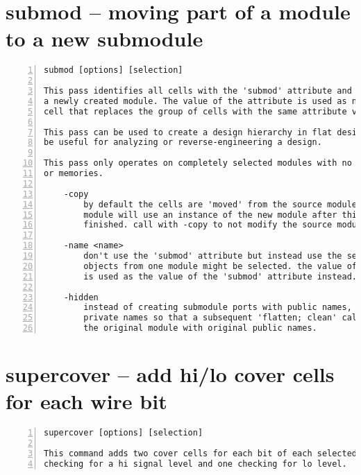 \section{submod -- moving part of a module to a new submodule}
\label{cmd:submod}
\begin{lstlisting}[numbers=left,frame=single]
    submod [options] [selection]

This pass identifies all cells with the 'submod' attribute and moves them to
a newly created module. The value of the attribute is used as name for the
cell that replaces the group of cells with the same attribute value.

This pass can be used to create a design hierarchy in flat design. This can
be useful for analyzing or reverse-engineering a design.

This pass only operates on completely selected modules with no processes
or memories.

    -copy
        by default the cells are 'moved' from the source module and the source
        module will use an instance of the new module after this command is
        finished. call with -copy to not modify the source module.

    -name <name>
        don't use the 'submod' attribute but instead use the selection. only
        objects from one module might be selected. the value of the -name option
        is used as the value of the 'submod' attribute instead.

    -hidden
        instead of creating submodule ports with public names, create ports with
        private names so that a subsequent 'flatten; clean' call will restore
        the original module with original public names.
\end{lstlisting}

\section{supercover -- add hi/lo cover cells for each wire bit}
\label{cmd:supercover}
\begin{lstlisting}[numbers=left,frame=single]
    supercover [options] [selection]

This command adds two cover cells for each bit of each selected wire, one
checking for a hi signal level and one checking for lo level.
\end{lstlisting}

